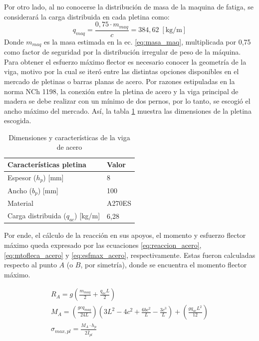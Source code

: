 Por otro lado, al no conocerse la distribución de masa de la maquina de fatiga, se considerará la carga distribuida en cada pletina como:
\begin{equation}
	 q_{maq} = \frac{0,75\cdot m_{maq}}{c} = 384,62 \; [\text{kg/m}]
\end{equation}
Donde $m_{maq}$ es la masa estimada en la ec. \ref{eq:masa_maq}, multiplicada por 0,75 como factor de seguridad por la distribución irregular de peso de la máquina. Para obtener el esfuerzo máximo flector es necesario conocer la geometría de la viga, motivo por la cual se iteró entre las distintas opciones disponibles en el mercado de pletinas o barras planas de acero. Por razones estipuladas en la norma NCh 1198, la conexión entre la pletina de acero y la viga principal de madera se debe realizar con un mínimo de dos pernos, por lo tanto, se escogió el ancho máximo del mercado. Así, la tabla \ref{tab:dimycar_pletina} muestra las dimensiones de la pletina escogida.
\begin{table}[h]
\centering
\begin{tabular}{@{}ll@{}}
\toprule
Características pletina			       			& Valor        \\ \midrule
Espesor ($h_p$) {[}mm{]}              			& 8            \\
Ancho ($b_p$) {[}mm{]}               		    & 100          \\
Material    		                		    & A270ES	   \\
Carga distribuida ($q_{ac}$) {[}kg/m{]}		    & 6,28         \\ \bottomrule
\end{tabular}
\caption{Dimensiones y características de la viga de acero}
\label{tab:dimycar_pletina}
\end{table}

Por ende, el cálculo de la reacción en sus apoyos, el momento y esfuerzo flector máximo queda expresado por las ecuaciones \ref{eq:reaccion_acero}, \ref{eq:mtofleca_acero} y \ref{eq:esfmax_acero}, respectivamente. Estas fueron calculadas respecto al punto $A$ (o $B$, por simetría), donde se encuentra el momento flector máximo.

\begin{subequations}
	\begin{gather}
		R_A = g\left(\frac{m_{maq}}{2} + \frac{q_{ac}L}{2}\right) \label{eq:reaccion_acero}\\ 
		M_A = \left(\frac{gcq_{maq}}{24L}\right) \left(3L^2 - 4c^2 + \frac{6bc^2}{L} - \frac{3c^3}{L}\right) + \left(\frac{gq_{ac}L^2}{12}\right) \label{eq:mtofleca_acero} \\
		\sigma_{max,pl} = \frac{M_A \cdot h_p}{2\bar{I}_{pl}} \label{eq:esfmax_acero}
	\end{gather}
\end{subequations}

